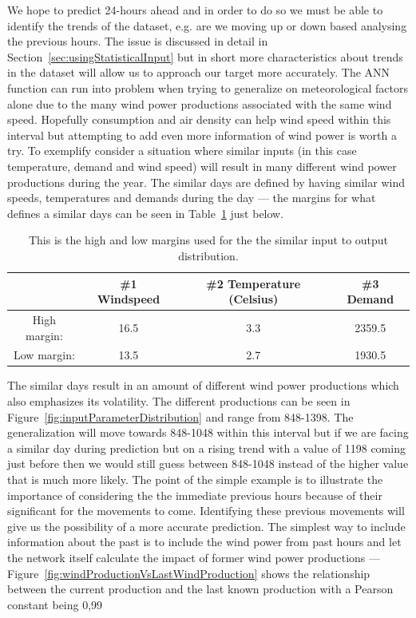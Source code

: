 \noindent We hope to predict 24-hours ahead and in order to do so we must be able to identify the trends of the dataset, e.g. are we moving up or down based analysing the previous hours. The issue is discussed in detail in Section~\ref{sec:usingStatisticalInput} but in short more characteristics about trends in the dataset will allow us to approach our target more accurately. The ANN function can run into problem when trying to generalize on meteorological factors alone due to the many wind power productions associated with the same wind speed. Hopefully consumption and air density can help wind speed within this interval but attempting to add even more information of wind power is worth a try. To exemplify consider a situation where similar inputs (in this case temperature, demand and wind speed) will result in many different wind power productions during the year. The similar days are defined by having similar wind speeds, temperatures and demands during the day --- the margins for what defines a similar days can be seen in Table~\ref{table:similarHoursLimitsWindProd} just below.

\begin{table}[H]
\centering  %
\begin{tabular}{|c|c|c|c|} %
 & \#1 Windspeed & \#2 Temperature (Celsius) & \#3 Demand \\ \hline %
\hline                  %
High margin: & 16.5 & 3.3 & 2359.5  \\ \hline
Low margin: & 13.5 & 2.7 & 1930.5 \\ \hline %
\hline %
\end{tabular}
\caption{This is the high and low margins used for the the similar input to output distribution.} %
\label{table:similarHoursLimitsWindProd} %
\end{table}

\noindent The similar days result in an amount of different wind power productions which also emphasizes its volatility. The different productions can be seen in Figure~\ref{fig:inputParameterDistribution} and range from 848-1398. The generalization will move towards 848-1048 within this interval but if we are facing a similar day during prediction but on a rising trend with a value of 1198 coming just before then we would still guess between 848-1048 instead of the higher value that is much more likely. The point of the simple example is to illustrate the importance of considering the the immediate previous hours because of their significant for the movements to come. Identifying these previous movements will give us the possibility of a more accurate prediction. The simplest way to include information about the past is to include the wind power from past hours and let the network itself calculate the impact of former wind power productions --- Figure~\ref{fig:windProductionVsLastWindProduction} shows the relationship between the current production and the last known production with a Pearson constant being 0,99   

